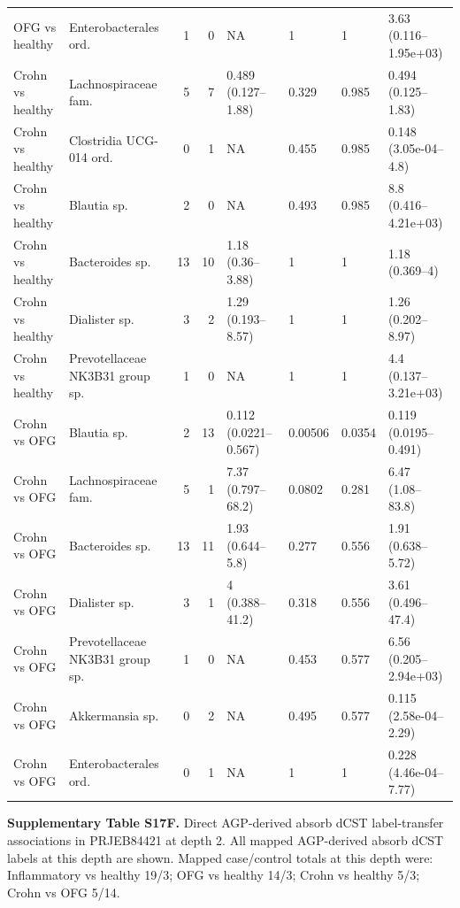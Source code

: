\begin{longtable}{@{} p{} p{} r r p{} p{} p{} p{} @{}}
OFG vs healthy & Enterobacterales ord. & 1 & 0 & NA & 1 & 1 & 3.63 (0.116--1.95e+03) \\
Crohn vs healthy & Lachnospiraceae fam. & 5 & 7 & 0.489 (0.127--1.88) & 0.329 & 0.985 & 0.494 (0.125--1.83) \\
Crohn vs healthy & Clostridia UCG-014 ord. & 0 & 1 & NA & 0.455 & 0.985 & 0.148 (3.05e-04--4.8) \\
Crohn vs healthy & Blautia sp. & 2 & 0 & NA & 0.493 & 0.985 & 8.8 (0.416--4.21e+03) \\
Crohn vs healthy & Bacteroides sp. & 13 & 10 & 1.18 (0.36--3.88) & 1 & 1 & 1.18 (0.369--4) \\
Crohn vs healthy & Dialister sp. & 3 & 2 & 1.29 (0.193--8.57) & 1 & 1 & 1.26 (0.202--8.97) \\
Crohn vs healthy & Prevotellaceae NK3B31 group sp. & 1 & 0 & NA & 1 & 1 & 4.4 (0.137--3.21e+03) \\
Crohn vs OFG & Blautia sp. & 2 & 13 & 0.112 (0.0221--0.567) & 0.00506 & 0.0354 & 0.119 (0.0195--0.491) \\
Crohn vs OFG & Lachnospiraceae fam. & 5 & 1 & 7.37 (0.797--68.2) & 0.0802 & 0.281 & 6.47 (1.08--83.8) \\
Crohn vs OFG & Bacteroides sp. & 13 & 11 & 1.93 (0.644--5.8) & 0.277 & 0.556 & 1.91 (0.638--5.72) \\
Crohn vs OFG & Dialister sp. & 3 & 1 & 4 (0.388--41.2) & 0.318 & 0.556 & 3.61 (0.496--47.4) \\
Crohn vs OFG & Prevotellaceae NK3B31 group sp. & 1 & 0 & NA & 0.453 & 0.577 & 6.56 (0.205--2.94e+03) \\
Crohn vs OFG & Akkermansia sp. & 0 & 2 & NA & 0.495 & 0.577 & 0.115 (2.58e-04--2.29) \\
Crohn vs OFG & Enterobacterales ord. & 0 & 1 & NA & 1 & 1 & 0.228 (4.46e-04--7.77) \\
\end{longtable}
\endgroup
\bigskip

\noindent\textbf{Supplementary Table S17F.} Direct AGP-derived absorb dCST label-transfer associations in PRJEB84421 at depth 2. All mapped AGP-derived absorb dCST labels at this depth are shown. Mapped case/control totals at this depth were: Inflammatory vs healthy 19/3; OFG vs healthy 14/3; Crohn vs healthy 5/3; Crohn vs OFG 5/14.

